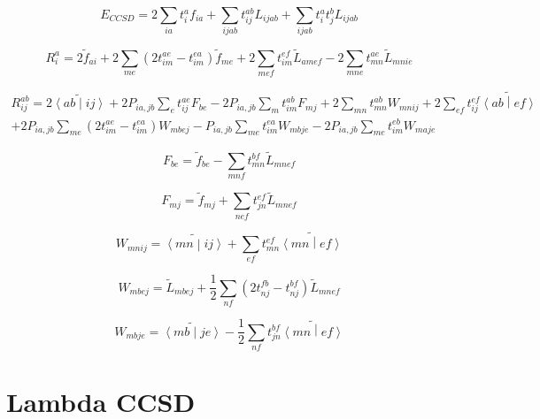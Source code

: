 \documentclass{article}
\begin{document}
\begin{equation}
  E_{CCSD} = 2\sum_{ia}t_i^af_{ia} + \sum_{ijab}t_{ij}^{ab}L_{ijab} + \sum_{ijab}t_i^at_j^bL_{ijab}
\end{equation}

\begin{equation}
  R_i^a = 2\tilde{f}_{ai} + 2\sum_{me}\left(2t_{im}^{ae} - t_{im}^{ea}\right)\tilde{f}_{me} + 2\sum_{mef}t_{im}^{ef}\tilde{L}_{amef} - 2\sum_{mne}t_{mn}^{ae}\tilde{L}_{mnie}
\end{equation}

\begin{multline}
  R_{ij}^{ab} = 2\widetilde{\left<ab\middle|ij\right>} + 2P_{ia,jb}\sum_et_{ij}^{ae}F_{be} - 2P_{ia,jb}\sum_mt_{im}^{ab}F_{mj} + 2\sum_{mn}t_{mn}^{ab}W_{mnij} + 2\sum_{ef}t_{ij}^{ef}\widetilde{\left<ab\middle|ef\right>} \\
  + 2P_{ia,jb}\sum_{me}\left(2t_{im}^{ae} - t_{im}^{ea}\right)W_{mbej} - P_{ia,jb}\sum_{me}t_{im}^{ea}W_{mbje} - 2P_{ia,jb}\sum_{me}t_{im}^{eb}W_{maje}
\end{multline}

\begin{equation}
  F_{be} = \tilde{f}_{be} - \sum_{mnf}t_{mn}^{bf}\tilde{L}_{mnef}
\end{equation}

\begin{equation}
  F_{mj} = \tilde{f}_{mj} + \sum_{nef} t_{jn}^{ef}\tilde{L}_{mnef}
\end{equation}

\begin{equation}
  W_{mnij} = \widetilde{\left<mn\middle|ij\right>} + \sum_{ef}t_{mn}^{ef}\widetilde{\left<mn\middle|ef\right>}
\end{equation}

\begin{equation}
  W_{mbej} = \tilde{L}_{mbej} + \frac{1}{2}\sum_{nf}\left(2t_{nj}^{fb} - t_{nj}^{bf}\right)\tilde{L}_{mnef}
\end{equation}

\begin{equation}
  W_{mbje} = \widetilde{\left<mb\middle|je\right>} - \frac{1}{2} \sum_{nf}t_{jn}^{bf}\widetilde{\left<mn\middle|ef\right>}
\end{equation}

\section{Lambda CCSD}
\end{document}
